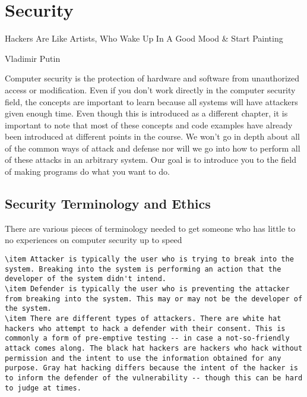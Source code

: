 \chapter{Security}

\epigraph{Hackers Are Like Artists, Who Wake Up In A Good Mood \& Start Painting}{Vladimir Putin}

Computer security is the protection of hardware and software from unauthorized access or modification.
Even if you don't work directly in the computer security field, the concepts are important to learn because all systems will have attackers given enough time.
Even though this is introduced as a different chapter, it is important to note that most of these concepts and code examples have already been introduced at different points in the course.
We won't go in depth about all of the common ways of attack and defense nor will we go into how to perform all of these attacks in an arbitrary system.
Our goal is to introduce you to the field of making programs do what you want to do.

\section{Security Terminology and Ethics}

There are various pieces of terminology needed to get someone who has little to no experiences on computer security up to speed

\begin{lstlisting}
\item Attacker is typically the user who is trying to break into the system. Breaking into the system is performing an action that the developer of the system didn't intend.
\item Defender is typically the user who is preventing the attacker from breaking into the system. This may or may not be the developer of the system.
\item There are different types of attackers. There are white hat hackers who attempt to hack a defender with their consent. This is commonly a form of pre-emptive testing -- in case a not-so-friendly attack comes along. The black hat hackers are hackers who hack without permission and the intent to use the information obtained for any purpose. Gray hat hacking differs because the intent of the hacker is to inform the defender of the vulnerability -- though this can be hard to judge at times.
\end{lstlisting}

